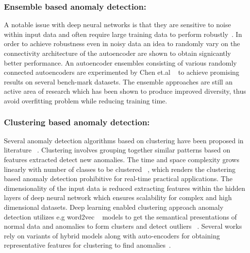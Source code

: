 \subsubsection{Ensemble based anomaly detection:}
 A notable issue with deep neural networks is that they are sensitive to noise within input data and often require large training data to perform robustly~\cite{kim2016lstm}. In order to achieve robustness even in noisy data an idea to randomly vary on the connectivity architecture of the autoencoder are shown to obtain signicantly better performance. An autoencoder ensembles consisting of  various randomly connected autoencoders are experimented by Chen et.al ~\cite{chen2017outlier} to achieve promising results on several bench-mark datasets. The ensemble approaches are still an active area of research which has been shown to produce improved diversity, thus avoid overfitting problem while reducing training time.


\subsubsection{Clustering based anomaly detection:}
Several anomaly detection  algorithms based on clustering have been proposed in literature ~\cite{ester1996density}. Clustering involves grouping together similar patterns based on features extracted  detect new anomalies. The time and space complexity grows linearly with number of classes to be clustered ~\cite{sreekanth2010generalized}, which renders the clustering based anomaly detection prohibitive for real-time practical applications.  The dimensionality of the input data is reduced  extracting features within the hidden layers of deep neural network which ensures scalability for complex and high dimensional datasets.  Deep learning enabled clustering approach anomaly detection utilizes e.g word2vec ~\cite{mikolov2013efficient}  models to get the semantical presentations of normal data and anomalies to form clusters and detect outliers ~\cite{yuan2017deep}. Several works rely on variants of hybrid models along with auto-encoders for obtaining representative features for  clustering to find anomalies~\cite{aytekin2018clustering,xie2016unsupervised,guo2017improved,xie2016unsupervised,guo2017deep,wang2016learning,mani2018scalable}.


